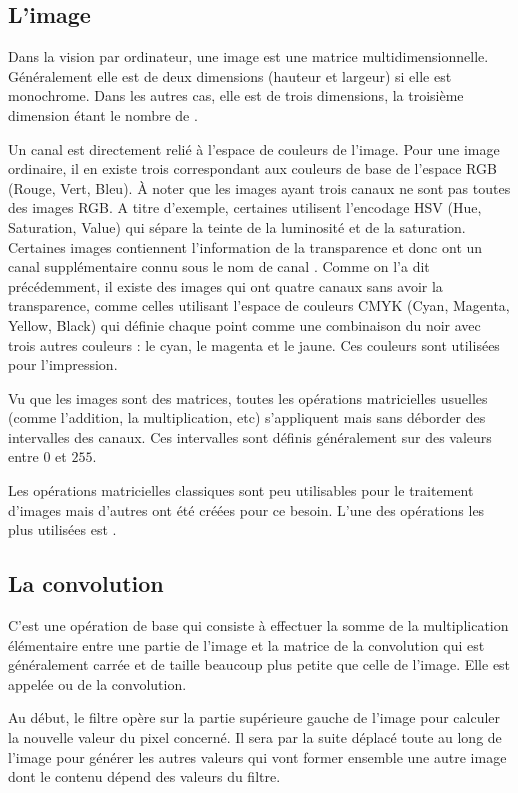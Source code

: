 \subsection{L'image}

Dans la vision par ordinateur, une image est une matrice multidimensionnelle.
Généralement elle est de deux dimensions (hauteur et largeur) si
elle est monochrome. Dans les autres cas, elle est de trois dimensions, la troisième
dimension étant le nombre de .

Un canal est directement relié à l'espace de couleurs de l'image.
Pour une image ordinaire, il en existe trois correspondant aux couleurs de base
de l'espace RGB (Rouge, Vert, Bleu). \`A noter que les images ayant trois
canaux ne sont pas toutes des images RGB. A titre d'exemple, certaines utilisent
l'encodage HSV (Hue, Saturation, Value) qui sépare la teinte de la luminosité et
de la saturation. Certaines images contiennent l'information de la transparence
et donc ont un canal supplémentaire connu sous le nom de canal .
Comme on l'a dit précédemment, il existe des images qui ont quatre canaux sans
avoir la transparence, comme celles utilisant l'espace de couleurs CMYK
(Cyan, Magenta, Yellow, Black) qui définie chaque point comme une
combinaison du noir avec trois autres couleurs : le cyan, le magenta et le jaune.
Ces couleurs sont utilisées pour l'impression.

Vu que les images sont des matrices, toutes les opérations matricielles usuelles
(comme l'addition, la multiplication, etc) s'appliquent mais sans déborder des
intervalles des canaux. Ces intervalles sont définis généralement sur des
valeurs entre $0$ et $255$.

Les opérations matricielles classiques sont peu utilisables pour le traitement
d'images mais d'autres ont été créées pour ce besoin. L'une des opérations les
plus utilisées est .

\subsection{La convolution}

C'est une opération de base qui consiste à effectuer la somme de la multiplication
élémentaire entre une partie de l'image et la matrice de la convolution qui est
généralement carrée et de taille beaucoup plus petite que celle de l'image.
Elle est appelée  ou  de la convolution.

Au début, le filtre opère sur la partie supérieure gauche de l'image pour
calculer la nouvelle valeur du pixel concerné. Il sera
par la suite déplacé toute au long de l'image pour générer les autres valeurs
qui vont former ensemble une autre image dont le contenu dépend des valeurs du
filtre.

